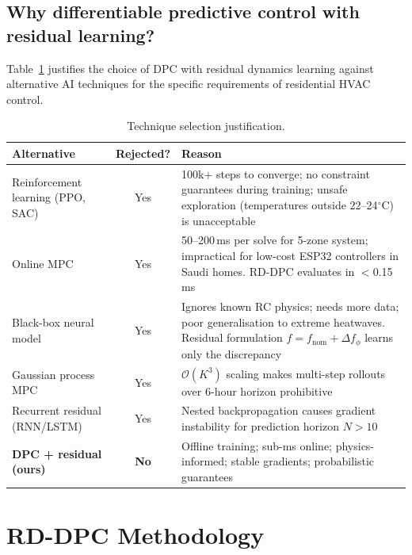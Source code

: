 \documentclass[12pt]{article}
\theoremstyle{plain}
\theoremstyle{definition}
\begin{document}
\subsection{Why differentiable predictive control with residual learning?}\label{sec:why}

Table~\ref{tab:technique} justifies the choice of DPC with residual dynamics learning against alternative AI techniques for the specific requirements of residential HVAC control.

\begin{table}[H]
\centering
\caption{Technique selection justification.}\label{tab:technique}
\begin{tabular*}{\textwidth}{@{\extracolsep{\fill}}lcp{6.5cm}}
\toprule
Alternative & Rejected? & Reason \\
\midrule
Reinforcement learning (PPO, SAC) & Yes & 100k+ steps to converge; no constraint guarantees during training; unsafe exploration (temperatures outside 22--24$^\circ$C) is unacceptable~\cite{brunke2022safe,dulac2021challenges} \\
Online MPC & Yes & 50--200\,ms per solve for 5-zone system; impractical for low-cost ESP32 controllers in Saudi homes. RD-DPC evaluates in $<$0.15\,ms \\
Black-box neural model & Yes & Ignores known RC physics; needs more data; poor generalisation to extreme heatwaves. Residual formulation $\hat{f} = f_{\text{nom}} + \Delta f_\phi$ learns only the discrepancy \\
Gaussian process MPC & Yes & $\mathcal{O}(K^3)$ scaling makes multi-step rollouts over 6-hour horizon prohibitive~\cite{wabersich2023data} \\
Recurrent residual (RNN/LSTM) & Yes & Nested backpropagation causes gradient instability for prediction horizon $N > 10$ \\
\midrule
\textbf{DPC + residual (ours)} & \textbf{No} & Offline training; sub-ms online; physics-informed; stable gradients; probabilistic guarantees \\
\bottomrule
\end{tabular*}
\end{table}

\section{RD-DPC Methodology}\label{sec:method}
\end{document}
